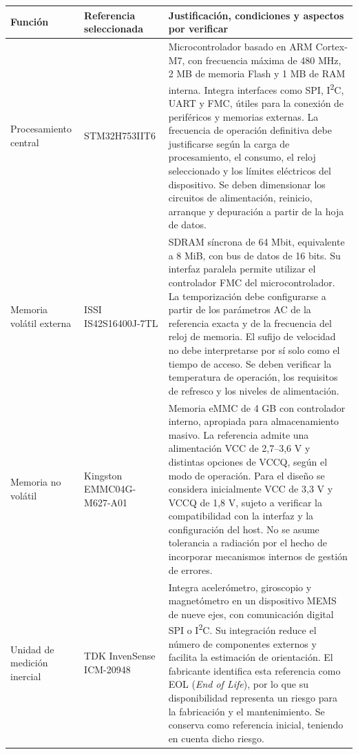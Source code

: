 \documentclass[11pt,a4paper]{article}
\begin{document}
\begin{table}[htbp]
\centering
\renewcommand{\arraystretch}{1.35}
\small
\begin{tabularx}{\textwidth}{
|>{\raggedright\arraybackslash}p{2.6cm}
|>{\raggedright\arraybackslash}p{3.0cm}
|X|}
\hline
\textbf{Función} & \textbf{Referencia seleccionada} &
\textbf{Justificación, condiciones y aspectos por verificar} \\
\hline

Procesamiento central &
STM32H753IIT6 &
Microcontrolador basado en ARM Cortex-M7, con frecuencia máxima de
480 MHz, 2 MB de memoria Flash y 1 MB de RAM interna. Integra
interfaces como SPI, I\textsuperscript{2}C, UART y FMC, útiles para
la conexión de periféricos y memorias externas. La frecuencia de
operación definitiva debe justificarse según la carga de procesamiento,
el consumo, el reloj seleccionado y los límites eléctricos del
dispositivo. Se deben dimensionar los circuitos de alimentación,
reinicio, arranque y depuración a partir de la hoja de datos. \\
\hline

Memoria volátil externa &
ISSI IS42S16400J-7TL &
SDRAM síncrona de 64 Mbit, equivalente a 8 MiB, con bus de datos de
16 bits. Su interfaz paralela permite utilizar el controlador FMC del
microcontrolador. La temporización debe configurarse a partir de los
parámetros AC de la referencia exacta y de la frecuencia del reloj
de memoria. El sufijo de velocidad no debe interpretarse por sí solo
como el tiempo de acceso. Se deben verificar la temperatura de
operación, los requisitos de refresco y los niveles de alimentación. \\
\hline

Memoria no volátil &
Kingston EMMC04G-M627-A01 &
Memoria eMMC de 4 GB con controlador interno, apropiada para
almacenamiento masivo. La referencia admite una alimentación VCC
de 2,7--3,6 V y distintas opciones de VCCQ, según el modo de
operación. Para el diseño se considera inicialmente VCC de 3,3 V
y VCCQ de 1,8 V, sujeto a verificar la compatibilidad con la interfaz
y la configuración del host. No se asume tolerancia a radiación por
el hecho de incorporar mecanismos internos de gestión de errores. \\
\hline

Unidad de medición inercial &
TDK InvenSense ICM-20948 &
Integra acelerómetro, giroscopio y magnetómetro en un dispositivo
MEMS de nueve ejes, con comunicación digital SPI o I\textsuperscript{2}C.
Su integración reduce el número de componentes externos y facilita
la estimación de orientación. El fabricante identifica esta referencia
como EOL (\textit{End of Life}), por lo que su disponibilidad representa
un riesgo para la fabricación y el mantenimiento. Se conserva como
referencia inicial, teniendo en cuenta dicho riesgo. \\
\hline


\end{tabularx}
\end{table}
\end{document}
